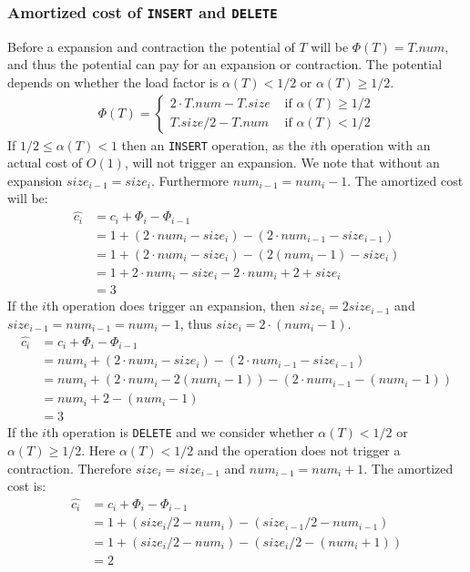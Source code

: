 \subsubsection*{Amortized cost of \texttt{INSERT} and \texttt{DELETE}}
Before a expansion and contraction the potential of $T$ will be $\Phi(T)=T.num$,
and thus the potential can pay for an expansion or contraction. The potential
depends on whether the load factor is $\alpha(T)<1/2$ or $\alpha(T)\geq1/2$.
\begin{align*}
  \Phi(T)=
  \begin{cases}
    2\cdot T.num-T.size &\textrm{ if }\alpha(T)\geq1/2\\
    T.size/2-T.num&\textrm{ if }\alpha(T)<1/2
  \end{cases}
\end{align*}
If $1/2\leq\alpha(T)<1$ then an \texttt{INSERT} operation, as the $i$th
operation with an actual cost of $O(1)$, will not trigger an expansion. We note
that without an expansion $size_{i-1}=size_i$. Furthermore $num_{i-1}=num_i-1$.
The amortized cost will be:
\begin{align*}
  \hat{c_i}&=c_i+\Phi_i-\Phi_{i-1}\\
  &=1+(2\cdot num_i-size_i)-(2\cdot num_{i-1}-size_{i-1})\\
  &=1+(2\cdot num_i-size_i)-(2(num_i-1)-size_i)\\
  &=1+2\cdot num_i-size_i-2\cdot num_i+2+size_i\\
  &=3
\end{align*}
If the $i$th operation does trigger an expansion, then $size_i=2size_{i-1}$ and
$size_{i-1}=num_{i-1}=num_i-1$, thus $size_i=2\cdot(num_i-1)$.
\begin{align*}
  \hat{c_i}&=c_i+\Phi_i-\Phi_{i-1}\\
  &=num_i+(2\cdot num_i-size_i)-(2\cdot num_{i-1}-size_{i-1})\\
  &=num_i+(2\cdot num_i-2(num_i-1))-(2\cdot num_{i-1}-(num_i-1))\\
  &=num_i+2-(num_i-1)\\
  &=3
\end{align*}
If the $i$th operation is \texttt{DELETE} and we consider whether
$\alpha(T)<1/2$ or $\alpha(T)\geq1/2$. Here $\alpha(T)<1/2$ and the operation
does not trigger a contraction. Therefore $size_i=size_{i-1}$ and $num_{i-1}=
num_i+1$. The amortized cost is:
\begin{align*}
  \hat{c_i}&=c_i+\Phi_i-\Phi_{i-1}\\
  &=1+(size_i/2-num_i)-(size_{i-1}/2-num_{i-1})\\
  &=1+(size_i/2-num_i)-(size_i/2-(num_i+1))\\
  &=2
\end{align*}
